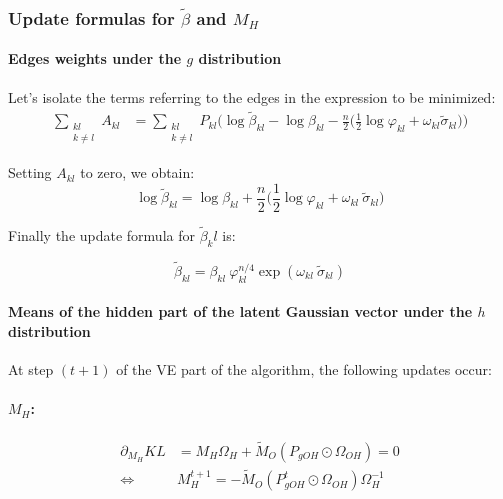 \documentclass[11pt,a4paper]{article}
\begin{document}
\subsubsection{Update formulas for $\widetilde{\beta}$ and $M_H$ }

\paragraph{Edges weights under the $g$ distribution \\}
Let's isolate the terms referring to the edges in the expression to be minimized:
\begin{align*}
 \sum_{\substack{kl\\ k \neq l}} A_{kl} &= \sum_{\substack{kl\\ k \neq l}} P_{kl}\Big(\log \widetilde{\beta}_{kl} - \log \beta_{kl} - \frac{n}{2} \big( \frac{1}{2} \log \varphi_{kl} +\omega_{kl} \widetilde{\sigma}_{kl} \big)\Big)   
\end{align*}

 
Setting $A_{kl}$ to zero, we obtain:
 $$\log \widetilde{\beta}_{kl} = \log \beta_{kl} + \frac{n}{2} \big( \frac{1}{2} \log \varphi_{kl} + \omega_{kl}\: \widetilde{\sigma}_{kl} \big) $$
 
 Finally the update formula for $\widetilde{\beta}_kl$ is:
 
  $$\boxed{\displaystyle \widetilde{\beta}_{kl} = \beta_{kl} \: \varphi_{kl}^{n/4} \exp( \omega_{kl}\: \widetilde{\sigma}_{kl} ) }$$
 
\paragraph{Means of the hidden part of the latent Gaussian vector under the $h$ distribution \\}
At step $(t+1)$ of the VE part of the algorithm, the following updates occur:
\paragraph{$M_H$:}
\begin{align*}
\partial_{M_H} KL &= M_H\Omega_H  + \widetilde{M}_O(P_{gOH}\odot\Omega_{OH}) =0\\
\iff& \boxed{M_H^{t+1} =- \widetilde{M}_O(P_{gOH}^t\odot\Omega_{OH})\Omega_H^{-1}}
\end{align*}
\end{document}
